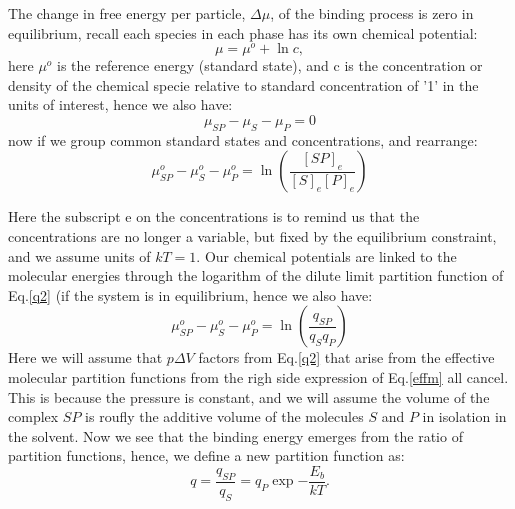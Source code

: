 The change in free energy per particle, $\Delta \mu$, of the binding process is zero in equilibrium, recall each species in each phase has its own chemical potential:
\begin{equation}\label{chemc}
 \mu = \mu^o + \ln{c},
 \end{equation}
  here $\mu^o$ is the reference energy (standard state), and c is the concentration or density of the chemical specie relative to standard concentration of '1' in the units of interest, hence we also have:
\begin{equation}
 \mu_{SP} - \mu_S - \mu_P   = 0
\end{equation}
now if we group common standard states and concentrations, and rearrange:
\begin{equation}\label{}
  \mu_{SP}^o - \mu_S^o - \mu_P^o = \ln( \frac{ [SP]_e }{[S]_e [P]_e} )
\end{equation}


Here the subscript e on the concentrations is to remind us that the concentrations are no longer a variable, but fixed by the equilibrium constraint, and we assume units of $kT=1$.  Our chemical potentials are linked to the molecular energies through the logarithm of the dilute limit partition function of Eq.\ref{q2} (if the system is in equilibrium, hence we also have:
\begin{equation}\label{effm}
  \mu_{SP}^o - \mu_S^o - \mu_P^o = \ln( \frac{ q_{SP} } { q_S q_P })
\end{equation}
Here we will assume that $p\Delta V$ factors from Eq.\ref{q2} that arise from the effective molecular partition functions from the righ side expression of Eq.\ref{effm} all cancel.  This is because the pressure is constant, and we will assume the volume of the complex $SP$ is roufly the additive volume of the molecules $S$ and $P$ in isolation in the solvent.  Now we see that the binding energy emerges from the ratio of partition functions, hence, we define a new partition function as:
\begin{equation}\label{}
  q = \frac{ q_{SP} } { q_S } = q_{P} \exp{-\frac{E_b}{kT} }.
\end{equation}

